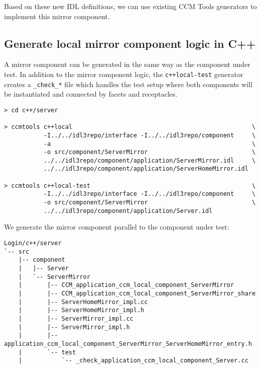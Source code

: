 Based on these new IDL definitions, we can use existing CCM Tools generators to
implement this mirror component.


\subsection{Generate local mirror component logic in C++}
\label{subsection:GenerateLocalMirrorComponentLogicCxx}

A mirror component can be generated in the same way as the component under test.
In addition to the mirror component logic, the {\tt c++local-test} generator creates
a {\tt \_check\_*} file which handles the test setup where both components will be
instantiated and connected by facets and receptacles.   

\begin{footnotesize}
\begin{verbatim}
> cd c++/server

> ccmtools c++local                                                  \
           -I../../idl3repo/interface -I../../idl3repo/component     \
           -a                                                        \
           -o src/component/ServerMirror                             \
           ../../idl3repo/component/application/ServerMirror.idl     \
           ../../idl3repo/component/application/ServerHomeMirror.idl

> ccmtools c++local-test                                             \
           -I../../idl3repo/interface -I../../idl3repo/component     \
           -o src/component/ServerMirror                             \
           ../../idl3repo/component/application/Server.idl           
\end{verbatim}
\end{footnotesize}

We generate the mirror component parallel to the component under test:
\begin{footnotesize}
\begin{verbatim}
Login/c++/server
`-- src
    |-- component
    |   |-- Server
    |   `-- ServerMirror
    |       |-- CCM_application_ccm_local_component_ServerMirror
    |       |-- CCM_application_ccm_local_component_ServerMirror_share
    |       |-- ServerHomeMirror_impl.cc
    |       |-- ServerHomeMirror_impl.h
    |       |-- ServerMirror_impl.cc
    |       |-- ServerMirror_impl.h
    |       |-- application_ccm_local_component_ServerMirror_ServerHomeMirror_entry.h
    |       `-- test
    |           `-- _check_application_ccm_local_component_Server.cc
\end{verbatim}
\end{footnotesize}



